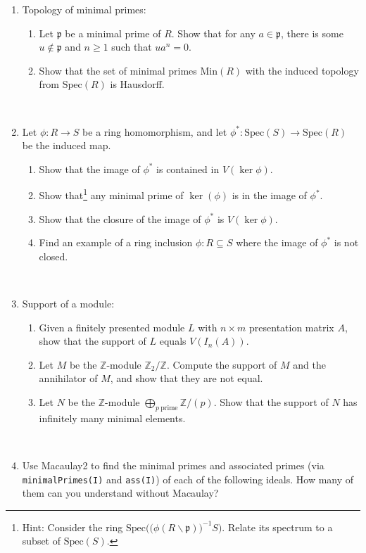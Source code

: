 \documentclass[12pt]{amsart}
\newcommand{\Q}{\mathbb{Q}}
\newcommand{\Z}{\mathbb{Z}}
\newcommand{\p}{\mathfrak{p}}
\newcommand{\Spec}{\mathrm{Spec}}
\newcommand{\Min}{\mathrm{Min}}
\begin{document}
\begin{enumerate}

\item Topology of minimal primes:
\begin{enumerate}
 \item Let $\p$ be a minimal prime of $R$. Show that for any $a\in \p$, there is some $u\notin \p$ and $n\geq 1$ such that $ua^n=0$.
\item Show that the set of minimal primes $\Min(R)$ with the induced topology from $\Spec(R)$ is Hausdorff.
\end{enumerate}

\

\item Let $\phi:R\to S$ be a ring homomorphism, and let $\phi^*:\Spec(S)\to \Spec(R)$ be the induced map.
\begin{enumerate}
\item Show that the image of $\phi^*$ is contained in $V(\ker \phi)$.
\item Show that\footnote{Hint: Consider the ring  $\Spec\Big( \big(\phi(R\smallsetminus \p)\big)^{-1} S\Big)$. Relate its spectrum to a subset of $\Spec(S)$.} any minimal prime of $\ker(\phi)$ is in the image of $\phi^*$.
\item Show that the closure of the image of $\phi^*$ is $V(\ker \phi)$.
\item Find an example of a ring inclusion $\phi:R\subseteq S$ where the image of $\phi^*$ is not closed.
\end{enumerate}

\

\item Support of a module: 
\begin{enumerate}
\item Given a finitely presented module $L$ with $n\times m$ presentation matrix $A$, show that the support of $L$ equals $V(I_n(A))$.
\item Let $M$ be the $\Z$-module $\Z_2/\Z$. Compute the support of $M$ and the annihilator of $M$, and show that they are not equal.
\item Let $N$ be the $\Z$-module $\bigoplus_{p \ \text{prime}} \Z/(p)$. Show that the support of $N$ has infinitely many minimal elements.
\end{enumerate}

\

\item Use Macaulay2 to find the minimal primes and associated primes (via \texttt{minimalPrimes(I)} and \texttt{ass(I)}) of each of the following ideals. How many of them can you understand without Macaulay?
\begin{enumerate}


\end{enumerate}
\end{enumerate}
\end{document}
